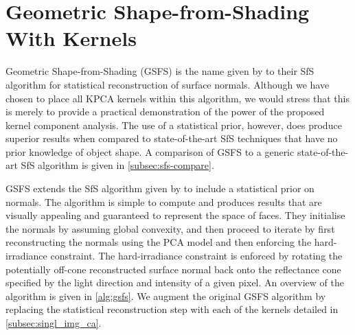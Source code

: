 \section{Geometric Shape-from-Shading With Kernels}\label{sec:singl_img_gsfs}
Geometric Shape-from-Shading (GSFS) is the name given by 
\cite{smith2006recovering,worthington1999new,smith2008facial} to their 
SfS algorithm for statistical 
reconstruction of surface normals. Although we have chosen to place all KPCA
kernels within this algorithm, we would stress that this is merely to provide a
practical demonstration of the power of the proposed kernel component analysis.
The use of a statistical prior, however, does produce superior results when
compared to state-of-the-art SfS techniques that have no prior knowledge of
object shape. A comparison of GSFS to a generic state-of-the-art SfS algorithm
is given in \cref{subsec:sfs-compare}.

GSFS extends the SfS algorithm given by \citet{worthington1999new} to include a 
statistical prior on normals. The algorithm
is simple to compute and produces results that are visually appealing and
guaranteed to represent the space of faces. They initialise the normals by
assuming global convexity, and then proceed to iterate by first reconstructing
the normals using the PCA model and then enforcing the hard-irradiance
constraint. The hard-irradiance constraint is enforced by rotating the
potentially off-cone reconstructed surface normal back onto the reflectance cone
specified by the light direction and intensity of a given pixel. An overview of
the algorithm is given in \cref{alg:gsfs}. We augment the original GSFS
algorithm by replacing the statistical reconstruction step with each of the
kernels detailed in \cref{subsec:singl_img_ca}.

